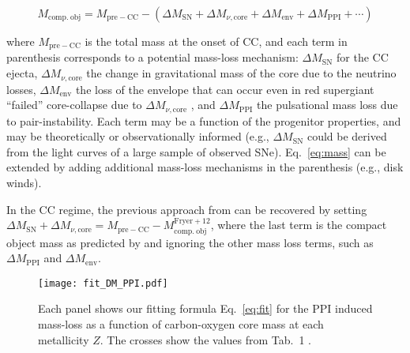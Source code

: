 \documentclass[twocolumn]{aastex63}
\DeclareRobustCommand{\Eqref}[1]{Eq.~\ref{#1}}
\begin{document}
\begin{widetext}
  \begin{equation}
    \label{eq:mass}
      M_\mathrm{comp.\ obj} =
      M_\mathrm{pre-CC} - \left(\Delta M_\mathrm{SN} + \Delta M_{\nu, \mathrm{core}} + \Delta M_\mathrm{env} + \Delta M_\mathrm{PPI} + \cdots \right)
  \end{equation}
\end{widetext}

where $M_\mathrm{pre-CC}$ is the total mass at the onset of CC, and
each term in parenthesis corresponds to a potential mass-loss
mechanism: $\Delta M_\mathrm{SN}$ for the CC ejecta,
$\Delta M_{\nu, \mathrm{core}}$ the change in gravitational mass of
the core due to the neutrino losses, $\Delta M_\mathrm{env}$ the loss
of the envelope that can occur even in red supergiant ``failed''
core-collapse due to %
$\Delta M_{\nu, \mathrm{core}}$
\citep{nadezhin:80, lovegrove:13, piro:13, fernandez:18, ivanov:21},
and $\Delta M_\mathrm{PPI}$ the pulsational mass loss due to
pair-instability. Each term may be a function of the progenitor
properties, and may be theoretically or observationally informed
(e.g., $\Delta M_\mathrm{SN}$ could be derived from the light curves of a
large sample of observed SNe). \Eqref{eq:mass} can be extended by
adding additional mass-loss mechanisms in the parenthesis (e.g., disk
winds).

In the CC regime, the previous approach from \cite{fryer:12} can be recovered by setting
$\Delta M_\mathrm{SN} + \Delta M_{\nu, \mathrm{core}} = M_\mathrm{pre-CC} - M_\mathrm{comp.\ obj}^\mathrm{Fryer+12}$,
where the last term is the compact object mass as predicted by
\cite{fryer:12} and ignoring the other mass loss terms,
such as $\Delta M_\mathrm{PPI}$ and $\Delta M_\mathrm{env}$.

\begin{figure}[tbp]
    \begin{centering}
      \texttt{[image: fit\_DM\_PPI.pdf]}
      \caption{Each panel shows our fitting formula \Eqref{eq:fit} for
        the PPI induced mass-loss as a function of carbon-oxygen core
        mass at each metallicity $Z$. The crosses show the values from
        Tab.~1 \cite{farmer:19}.}
        \label{fig:fit_DM_PPI}
    \end{centering}
\end{figure}
\end{document}

